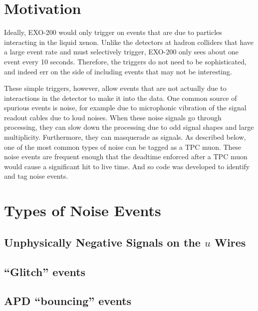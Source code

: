 \documentclass[herrin-thesis.tex]{subfiles}
\begin{document}
\section{Motivation}
Ideally, EXO-200 would only trigger on events that are due to particles interacting in the liquid xenon. Unlike the detectors at hadron colliders that have a large event rate and must selectively trigger, EXO-200 only sees about one event every 10 seconds. Therefore, the triggers do not need to be sophisticated, and indeed err on the side of including events that may not be interesting.

These simple triggers, however, allow events that are not actually due to interactions in the detector to make it into the data. One common source of spurious events is noise, for example due to microphonic vibration of the signal readout cables due to loud noises. When these noise signals go through processing, they can slow down the processing due to odd signal shapes and large multiplicity. Furthermore, they can masquerade as signals. As described below, one of the most common types of noise can be tagged as a TPC muon. These noise events are frequent enough that the deadtime enforced after a TPC muon would cause a significant hit to live time. And so code was developed to identify and tag noise events.

\section{Types of Noise Events}
\subsection{Unphysically Negative Signals on the \(u\) Wires}
\subsection{``Glitch'' events}
\subsection{APD ``bouncing'' events}
\end{document}
